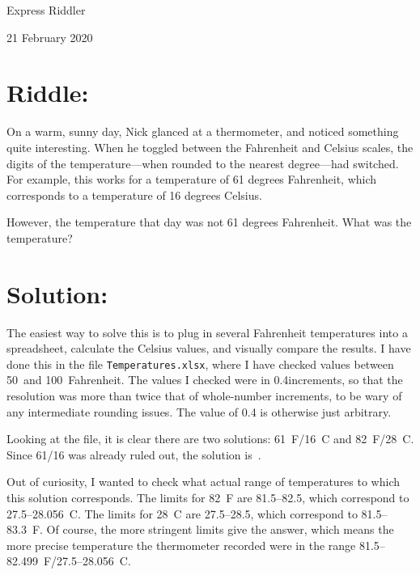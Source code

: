 \documentclass{article}
\begin{document}
\pagestyle{empty} %

\begin{center}
{\LARGE Express Riddler}

\vspace{0.15in}

{\Large 21 February 2020}
\end{center}


\section*{Riddle:}

On a warm, sunny day, Nick glanced at a thermometer, and noticed something quite interesting.
When he toggled between the Fahrenheit and Celsius scales, the digits of the temperature---when rounded to the nearest degree---had switched.
For example, this works for a temperature of 61 degrees Fahrenheit, which corresponds to a temperature of 16 degrees Celsius.

However, the temperature that day was not 61 degrees Fahrenheit.
What was the temperature?

\section*{Solution:}

The easiest way to solve this is to plug in several Fahrenheit temperatures into a spreadsheet, calculate the Celsius values, and visually compare the results.
I have done this in the file \texttt{Temperatures.xlsx}, where I have checked values between 50\textdegree\ and 100\textdegree\ Fahrenheit.
The values I checked were in 0.4\textdegree increments, so that the resolution was more than twice that of whole-number increments, to be wary of any intermediate rounding issues.
The value of 0.4 is otherwise just arbitrary.

Looking at the file, it is clear there are two solutions: 61\textdegree\ F/16\textdegree\ C and 82\textdegree\ F/28\textdegree\ C.
Since 61/16 was already ruled out, the solution is
\,.

Out of curiosity, I wanted to check what actual range of temperatures to which this solution corresponds.
The limits for 82\textdegree\ F are 81.5--82.5, which correspond to 27.5--28.056\textdegree\ C.
The limits for 28\textdegree\ C are 27.5--28.5, which correspond to 81.5--83.3\textdegree\ F.
Of course, the more stringent limits give the answer, which means the more precise temperature the thermometer recorded were in the range 81.5--82.499\textdegree\ F/27.5--28.056\textdegree\ C.
\end{document}
